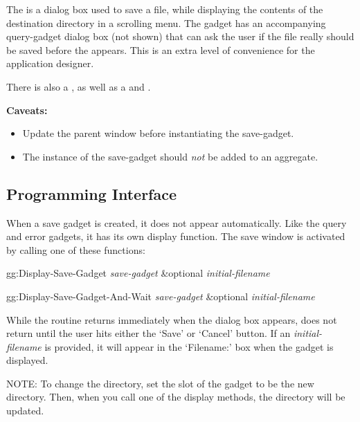 The  is a dialog box used to save a file, while displaying
the contents of the destination directory in a scrolling menu.  The gadget
has an accompanying query-gadget dialog box (not shown) that can ask the user
if the file really should be saved before the  appears.  This
is an extra level of convenience for the application designer.

There is also a , as well as a  and
.

\vspace{1 line}
\begin{group}
{\bf Caveats:
\begin{itemize}
\item Update the parent window before instantiating the save-gadget.

\item The instance of the save-gadget should {\it not} be added to an aggregate.
\end{itemize}}
\end{group}


\subsection{Programming Interface}

When a save gadget is created, it does not appear automatically.
Like the query and error gadgets, it has its own display function.
The save window is activated by calling one of these functions:

\begin{programexample}
gg:Display-Save-Gadget {\it save-gadget} \&optional {\it initial-filename}\value{function}

gg:Display-Save-Gadget-And-Wait {\it save-gadget} \&optional {\it initial-filename}\value{function}
\end{programexample}

While the  routine returns immediately when the
dialog box appears,  does not return
until the user hits either the `Save' or `Cancel' button.
If an {\it initial-filename} is provided, it will appear in the `Filename:'
box when the gadget is displayed.

NOTE: To change the directory, set the  slot of
the gadget to be the new directory.  Then, when you call one of the
display methods, the directory will be updated.

